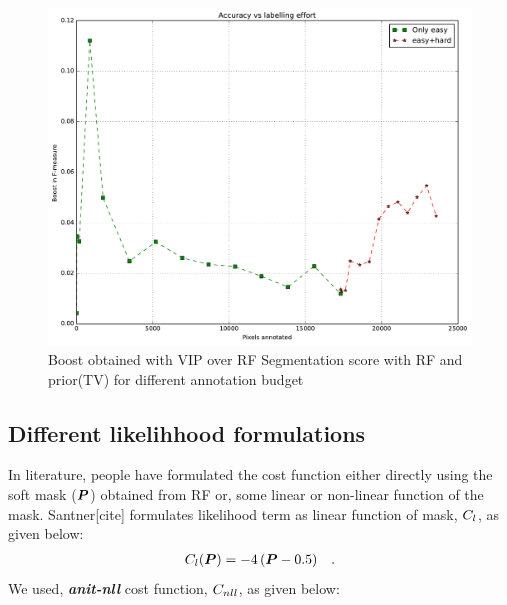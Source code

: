 \begin{figure}[h!] \label{fig:rf_vip1}
 \includegraphics[width=0.8\linewidth]{figures/vip_boost.pdf}
\caption{Boost obtained with VIP over RF Segmentation score with RF and prior(TV) for different annotation budget}
\end{figure}

\subsection{Different likelihhood formulations}
In literature, people have formulated the cost function either directly using the soft mask ($\boldsymbol{P}$) obtained from RF or, some linear or non-linear function of the mask. Santner[cite] formulates likelihood term as linear function of mask, $\mathop{{}C_l}$, as given below:
\begin{align*}
\mathop{{}C_l}(\boldsymbol{P}) = -4\,(\boldsymbol{P}-0.5) \quad .
\end{align*}
We used, \textbf{\textit{anit-nll}} cost function, $\mathop{{}C_{nll}}$, as given below:

